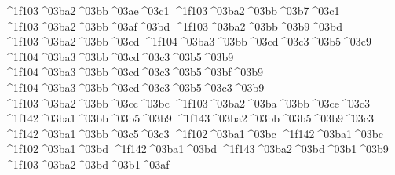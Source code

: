 {	^^^^1f103^^^^03ba2^^^^03bb^^^^03ae^^^^03c1		%
	^^^^1f103^^^^03ba2^^^^03bb^^^^03b7^^^^03c1 		%
	^^^^1f103^^^^03ba2^^^^03bb^^^^03af^^^^03bd		%
	^^^^1f103^^^^03ba2^^^^03bb^^^^03b9^^^^03bd		%
	^^^^1f103^^^^03ba2^^^^03bb^^^^03cd		%
		^^^^1f104^^^^03ba3^^^^03bb^^^^03cd^^^^03c3^^^^03b5^^^^03c9		%
		^^^^1f104^^^^03ba3^^^^03bb^^^^03cd^^^^03c3^^^^03b5^^^^03b9
		^^^^1f104^^^^03ba3^^^^03bb^^^^03cd^^^^03c3^^^^03b5^^^^03bf^^^^03b9
		^^^^1f104^^^^03ba3^^^^03bb^^^^03cd^^^^03c3^^^^03b5^^^^03c3^^^^03b9
	^^^^1f103^^^^03ba2^^^^03bb^^^^03cc^^^^03bc   		%
	^^^^1f103^^^^03ba2^^^^03ba^^^^03bb^^^^03ce^^^^03c3		%
^^^^1f142^^^^03ba1^^^^03bb^^^^03b5^^^^03b9       		%
	^^^^1f143^^^^03ba2^^^^03bb^^^^03b5^^^^03b9^^^^03c3		%
^^^^1f142^^^^03ba1^^^^03bb^^^^03c5^^^^03c3	       		%
^^^^1f102^^^^03ba1^^^^03bc
^^^^1f142^^^^03ba1^^^^03bc
^^^^1f102^^^^03ba1^^^^03bd
^^^^1f142^^^^03ba1^^^^03bd
	^^^^1f143^^^^03ba2^^^^03bd^^^^03b1^^^^03b9		%
	^^^^1f103^^^^03ba2^^^^03bd^^^^03b1^^^^03af		%
}
